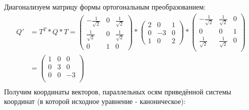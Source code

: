 \documentclass[12pt, a4paper]{article}
\begin{document}
Диагонализуем матрицу формы ортогональным преобразованием:
\begin{equation*}
\begin{aligned}
Q' &= T^T * Q * T =\begin{pmatrix}
-\frac{1}{\sqrt{2}} & 0  & \frac{1}{\sqrt{2}}\\
\frac{1}{\sqrt{2}} & 0 & \frac{1}{\sqrt{2}}\\
0 & 1 & 0
\end{pmatrix}
 *   \begin{pmatrix}
2 & 0 & 1\\
0 & -3 & 0\\
1 & 0 & 2
\end{pmatrix}* \begin{pmatrix}
-\frac{1}{\sqrt{2}} & \frac{1}{\sqrt{2}} & 0\\
0 & 0 & 1\\
\frac{1}{\sqrt{2}} & \frac{1}{\sqrt{2}} & 0\\
\end{pmatrix}\\
&=\begin{pmatrix}
1 & 0 & 0\\
0 & 3 & 0\\
0 & 0 & -3\\
\end{pmatrix}\\
\end{aligned}
\end{equation*}
Получим координаты векторов, параллельных осям приведённой системы координат (в которой исходное уравнение - каноническое):
\end{document}
